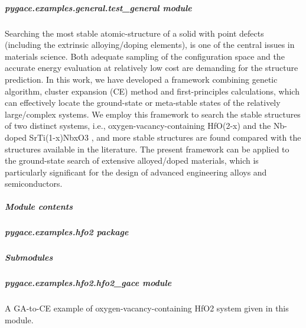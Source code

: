 \documentclass[letterpaper,10pt,english]{sphinxmanual}
\begin{document}
\subparagraph{pygace.examples.general.test\_general module}
\label{\detokenize{pygace.examples.general:pygace-examples-general-test-general-module}}\label{\detokenize{pygace.examples.general:module-pygace.examples.general.test_general}}
Searching the most stable atomic-structure of a solid with point defects
(including the extrinsic alloying/doping elements), is one of the central issues in
materials science. Both adequate sampling of the configuration space and the
accurate energy evaluation at relatively low cost are demanding for the structure
prediction. In this work, we have developed a framework combining genetic
algorithm, cluster expansion (CE) method and first-principles calculations, which
can effectively locate the ground-state or meta-stable states of the relatively
large/complex systems. We employ this framework to search the stable structures
of two distinct systems, i.e., oxygen-vacancy-containing HfO(2-x) and the
Nb-doped SrTi(1-x)NbxO3 , and more stable structures are found compared with
the structures available in the literature. The present framework can be applied
to the ground-state search of extensive alloyed/doped materials, which is
particularly significant for the design of advanced engineering alloys and
semiconductors.


\subparagraph{Module contents}
\label{\detokenize{pygace.examples.general:module-contents}}\label{\detokenize{pygace.examples.general:module-pygace.examples.general}}

\subparagraph{pygace.examples.hfo2 package}
\label{\detokenize{pygace.examples.hfo2::doc}}\label{\detokenize{pygace.examples.hfo2:pygace-examples-hfo2-package}}

\subparagraph{Submodules}
\label{\detokenize{pygace.examples.hfo2:submodules}}

\subparagraph{pygace.examples.hfo2.hfo2\_gace module}
\label{\detokenize{pygace.examples.hfo2:pygace-examples-hfo2-hfo2-gace-module}}\label{\detokenize{pygace.examples.hfo2:module-pygace.examples.hfo2.hfo2_gace}}
A GA-to-CE example of oxygen-vacancy-containing HfO2 system given in
this module.
\end{document}
